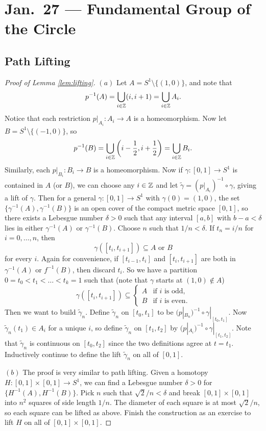 \chapter{Jan.~27 --- Fundamental Group of the Circle}

\section{Path Lifting}

\begin{proof}[Proof of Lemma \ref{lem:lifting}]
  $(a)$ Let $A = S^1 \setminus \{(1, 0)\}$, and note that
  \[
    p^{-1}(A) = \bigcup_{i \in \mathbb{Z}} (i, i + 1) = \bigcup_{i \in \mathbb{Z}} A_i.
  \]
  Notice that each restriction
  $p|_{A_i} : A_i \to A$ is a homeomorphism.
  Now let $B = S^1 \setminus \{(-1, 0)\}$, so
  \[
    p^{-1}(B) = \bigcup_{i \in \mathbb{Z}} \left(i - \frac{1}{2}, i + \frac{1}{2}\right)
    = \bigcup_{i \in \mathbb{Z}} B_i.
  \]
  Similarly, each $p|_{B_i} : B_i \to B$ is a
  homeomorphism. Now if $\gamma : [0, 1] \to S^1$ is
  contained in $A$ (or $B$), we can choose any $i \in \mathbb{Z}$
  and let $\widetilde{\gamma} = (p|_{A_i})^{-1} \circ \gamma$,
  giving a lift of $\gamma$. Then for a general
  $\gamma : [0, 1] \to S^1$ with $\gamma(0) = (1, 0)$,
  the set $\{\gamma^{-1}(A), \gamma^{-1}(B)\}$ is
  an open cover of the compact metric space $[0, 1]$,
  so there exists a Lebesgue number $\delta > 0$
  such that any interval $[a, b]$ with $b - a < \delta$
  lies in either $\gamma^{-1}(A)$ or $\gamma^{-1}(B)$.
  Choose $n$ such that $1 / n < \delta$. If
  $t_n = i / n$ for $i = 0, \dots, n$, then
  \[
    \gamma([t_i, t_{i + 1}]) \subseteq A \text{ or } B
  \]
  for every $i$. Again for convenience, if
  $[t_{i - 1}, t_i]$ and $[t_i, t_{i + 1}]$ are
  both in $\gamma^{-1}(A)$ or $f^{-1}(B)$, then
  discard $t_i$. So we have a partition
  $0 = t_0 < t_1 < \dots < t_k = 1$ such that
  (note that $\gamma$ starts at $(1, 0) \notin A$)
  \[
    \gamma([t_i, t_{i + 1}]) \subseteq
    \begin{cases}
      A & \text{if } i \text{ is odd}, \\
      B & \text{if } i \text{ is even}.
    \end{cases}
  \]
  Then we want to build $\widetilde{\gamma}_n$.
  Define $\widetilde{\gamma}_n$ on $[t_0, t_1]$
  to be $(p|_{B_n})^{-1} \circ \gamma|_{[t_0, t_1]}$.
  Now $\widetilde{\gamma}_n(t_1) \in A_i$ for a
  unique $i$, so define $\widetilde{\gamma}_n$
  on $[t_1, t_2]$ by $(p|_{A_i})^{-1} \circ \gamma|_{[t_1, t_2]}$.
  Note that $\widetilde{\gamma}_n$ is continuous
  on $[t_0, t_2]$ since the two definitions agree
  at $t = t_1$.
  Inductively continue to define the lift
  $\widetilde{\gamma}_n$ on all of $[0, 1]$.

  $(b)$ The proof is very similar to path lifting.
  Given a homotopy $H : [0, 1] \times [0, 1] \to S^1$,
  we can find a Lebesgue number $\delta > 0$
  for $\{H^{-1}(A), H^{-1}(B)\}$. Pick $n$
  such that $\sqrt{2} / n < \delta$ and break
  $[0, 1] \times [0, 1]$ into $n^2$ squares
  of side length $1 / n$. The diameter of each
  square is at most $\sqrt{2} / n$, so each square
  can be lifted as above. Finish the construction
  as an exercise to lift $H$ on all of
  $[0, 1] \times [0, 1]$.
\end{proof}

